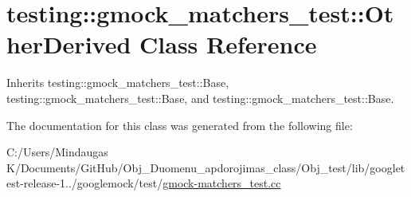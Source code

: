 \hypertarget{classtesting_1_1gmock__matchers__test_1_1_other_derived}{}\section{testing\+::gmock\+\_\+matchers\+\_\+test\+::Other\+Derived Class Reference}
\label{classtesting_1_1gmock__matchers__test_1_1_other_derived}


Inherits testing\+::gmock\+\_\+matchers\+\_\+test\+::\+Base, testing\+::gmock\+\_\+matchers\+\_\+test\+::\+Base, and testing\+::gmock\+\_\+matchers\+\_\+test\+::\+Base.



The documentation for this class was generated from the following file\+:\begin{DoxyCompactItemize}
\item 
C\+:/\+Users/\+Mindaugas K/\+Documents/\+Git\+Hub/\+Obj\+\_\+\+Duomenu\+\_\+apdorojimas\+\_\+class/\+Obj\+\_\+test/lib/googletest-\/release-\/1../googlemock/test/\mbox{\hyperlink{_obj__test_2lib_2googletest-release-1_88_81_2googlemock_2test_2gmock-matchers__test_8cc}{gmock-\/matchers\+\_\+test.\+cc}}\end{DoxyCompactItemize}
